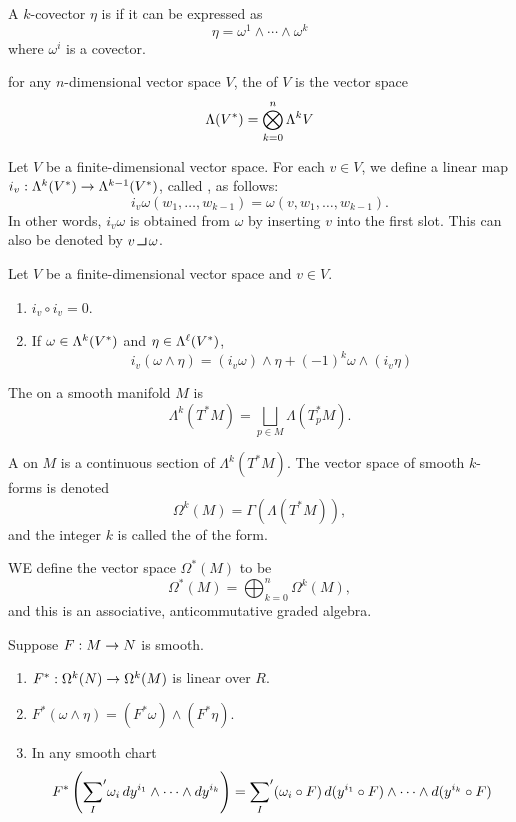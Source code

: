 \dfn A $k$-covector $\eta$ is  if it can be expressed as 
\[\eta = \omega^1\wedge \cdots\wedge \omega^k\]
where $\omega^i$ is a covector.

\dfn for any $n$-dimensional vector space $V$, the  of $V$ is the vector space 
\[\Lambda(V^*) = \bigotimes_{k = 0}^n \Lambda^k V\]


\dfn Let $V$ be a finite-dimensional vector space. For each $v\in V$, we define a linear map $i_v:\Lambda^k(V^*)\rightarrow\Lambda^{k - 1}(V^*)$, called , as follows:
\[i_v\omega(w_1,\ldots,w_{k - 1}) = \omega(v,w_1,\ldots,w_{k - 1}).\]
In other words, $i_v\omega$ is obtained from $\omega$ by inserting $v$ into the first slot. This can also be denoted by $v\hook \omega$.

\setcounter{thm}{12}

\begin{lem}
Let $V$ be a finite-dimensional vector space and $v\in V$.
\begin{enumerate}
    \item $i_v\circ i_v = 0$.
    \item If $\omega\in \Lambda^k(V^*)$ and $\eta\in \Lambda^\ell(V^*)$,
    \[i_v(\omega\wedge\eta) = (i_v\omega)\wedge\eta + (-1)^k\omega\wedge(i_v\eta)\]
\end{enumerate}
\end{lem}

\dfn The  on a smooth manifold $M$ is
\[\Lambda^k(T^*M) = \bigsqcup_{p\in M} \Lambda(T^*_pM).\]


\dfn A  on $M$ is a continuous section of $\Lambda^k(T^*M)$. The vector space of smooth $k$-forms is denoted 
\[\Omega^k(M) = \Gamma(\Lambda(T^*M)),\]
and the integer $k$ is called the  of the form.

\dfn WE define the vector space $\Omega^*(M)$ to be
\[\Omega^*(M) = \bigoplus_{k = 0}^n \Omega^k(M),\]
and this is an associative, anticommutative graded algebra.


\setcounter{thm}{15}

\begin{lem}
Suppose $F:M\rightarrow N$ is smooth.
\begin{enumerate}
    \item $F^*:\Omega^k(N)\rightarrow \Omega^k(M)$ is linear over $R$.
    \item $F^*(\omega\wedge\eta) = (F^*\omega)\wedge(F^*\eta)$.
    \item In any smooth chart
    \[F^*\left({\sum_I}^\prime\omega_i\,dy^{i_1}\wedge\cdots\wedge dy^{i_k}\right) = {\sum_I}^\prime(\omega_i\circ F)\,d(y^{i_1}\circ F)\wedge\cdots\wedge d(y^{i_k}\circ F)\]
\end{enumerate}
\end{lem}

